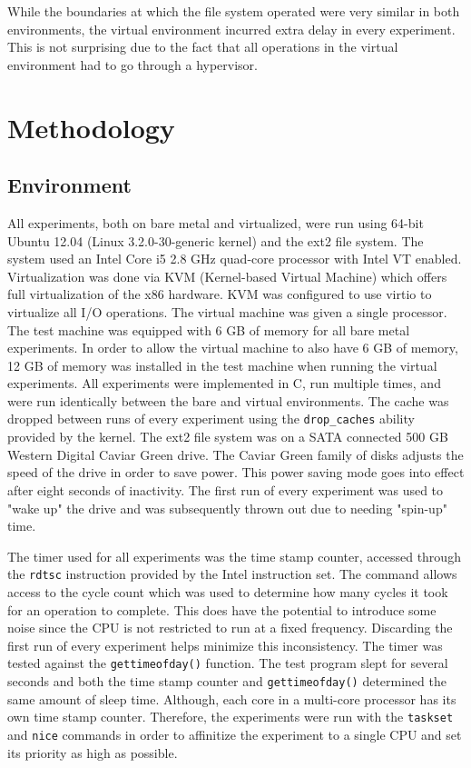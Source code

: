 \documentclass[letterpaper,twocolumn,10pt]{article}
\begin{document}
While the boundaries at which the file system operated were very similar in both environments, the virtual environment incurred extra delay in every experiment.
This is not surprising due to the fact that all operations in the virtual environment had to go through a hypervisor.

\section{Methodology}
\subsection{Environment}
All experiments, both on bare metal and virtualized, were run using 64-bit Ubuntu 12.04 (Linux 3.2.0-30-generic kernel) and the ext2 file system.
The system used an Intel Core i5 2.8 GHz quad-core processor with Intel VT enabled.
Virtualization was done via KVM (Kernel-based Virtual Machine) which offers full virtualization of the x86 hardware.
KVM was configured to use virtio to virtualize all I/O operations.
The virtual machine was given a single processor.
The test machine was equipped with 6 GB of memory for all bare metal experiments.
In order to allow the virtual machine to also have 6 GB of memory, 12 GB of memory was installed in the test machine when running the virtual experiments.
All experiments were implemented in C, run multiple times, and were run identically between the bare and virtual environments.
The cache was dropped between runs of every experiment using the \texttt{drop\_caches} ability provided by the kernel.
The ext2 file system was on a SATA connected 500 GB Western Digital Caviar Green drive. 
The Caviar Green family of disks adjusts the speed of the drive in order to save power. 
This power saving mode goes into effect after eight seconds of inactivity.
The first run of every experiment was used to "wake up" the drive and was subsequently thrown out due to needing "spin-up" time. 

The timer used for all experiments was the time stamp counter, accessed through the \texttt{rdtsc} instruction provided by the Intel instruction set. 
The command allows access to the cycle count which was used to determine how many cycles it took for an operation to complete. 
This does have the potential to introduce some noise since the CPU is not restricted to run at a fixed frequency. 
Discarding the first run of every experiment helps minimize this inconsistency. 
The timer was tested against the \texttt{gettimeofday()} function. 
The test program slept for several seconds and both the time stamp counter and \texttt{gettimeofday()} determined the same amount of sleep time. 
Although, each core in a multi-core processor has its own time stamp counter.
Therefore, the experiments were run with the \texttt{taskset} and \texttt{nice} commands in order to affinitize the experiment to a single CPU and set its priority as high as possible.
\end{document}
